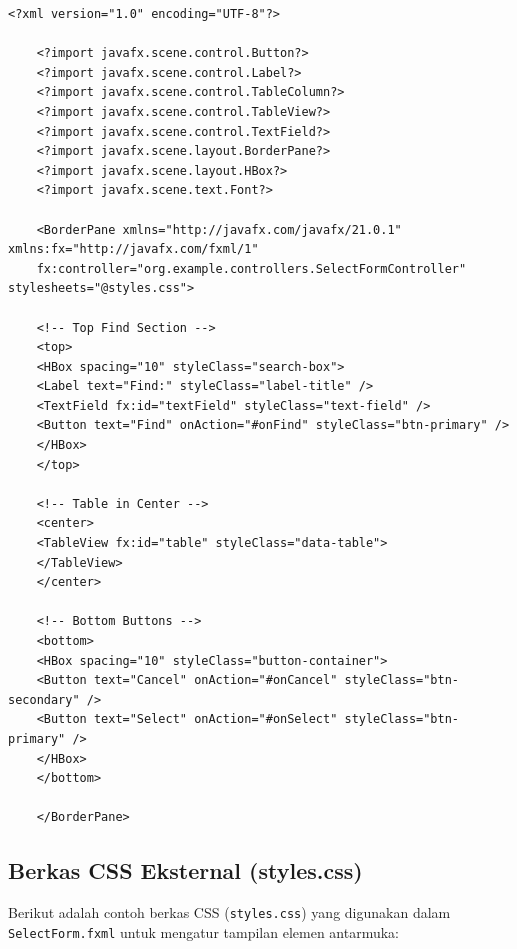 \begin{lstlisting}[style=XmlStyle]
	<?xml version="1.0" encoding="UTF-8"?>
	
	<?import javafx.scene.control.Button?>
	<?import javafx.scene.control.Label?>
	<?import javafx.scene.control.TableColumn?>
	<?import javafx.scene.control.TableView?>
	<?import javafx.scene.control.TextField?>
	<?import javafx.scene.layout.BorderPane?>
	<?import javafx.scene.layout.HBox?>
	<?import javafx.scene.text.Font?>
	
	<BorderPane xmlns="http://javafx.com/javafx/21.0.1" xmlns:fx="http://javafx.com/fxml/1" 
	fx:controller="org.example.controllers.SelectFormController" stylesheets="@styles.css">
	
	<!-- Top Find Section -->
	<top>
	<HBox spacing="10" styleClass="search-box">
	<Label text="Find:" styleClass="label-title" />
	<TextField fx:id="textField" styleClass="text-field" />
	<Button text="Find" onAction="#onFind" styleClass="btn-primary" />
	</HBox>
	</top>
	
	<!-- Table in Center -->
	<center>
	<TableView fx:id="table" styleClass="data-table">
	</TableView>
	</center>
	
	<!-- Bottom Buttons -->
	<bottom>
	<HBox spacing="10" styleClass="button-container">
	<Button text="Cancel" onAction="#onCancel" styleClass="btn-secondary" />
	<Button text="Select" onAction="#onSelect" styleClass="btn-primary" />
	</HBox>
	</bottom>
	
	</BorderPane>
\end{lstlisting}

\subsection{Berkas CSS Eksternal (styles.css)}

Berikut adalah contoh berkas CSS (\texttt{styles.css}) yang digunakan dalam \texttt{SelectForm.fxml} untuk mengatur tampilan elemen antarmuka:

